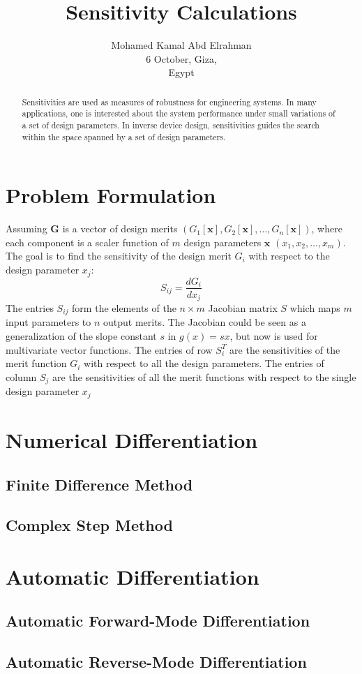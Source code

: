\documentclass{tufte-handout}
\title{Sensitivity Calculations}
\author[mohamedkamal]{Mohamed Kamal Abd Elrahman \\
6 October, Giza,\\ Egypt}
\begin{document}
	\maketitle
	\begin{abstract}
		\noindent 
	Sensitivities are used as measures of robustness for engineering systems. In many applications, one is interested about the system performance under small variations of a set of design parameters. In inverse device design, sensitivities guides the search within the space spanned by a set of design parameters.  
	\end{abstract}
\section{Problem Formulation}	
 Assuming $\mathbf{G}$	is a vector of design merits $ (G_1[\mathbf{x}], G_2[\mathbf{x}], \dots,G_n[\mathbf{x}]) $, where each component is a scaler function of $m$ design parameters $\mathbf{x}$	$ (x_1,x_2,\dots, x_m)$. The goal is to find the sensitivity of the design merit $G_i$  with respect to the design parameter $x_j$:
	 \begin{equation}
	 S_{ij} = \frac{d G_i}{dx_j}
	 \end{equation}
The entries $S_{ij}$ form the elements of the  $n \times m$  Jacobian matrix $S$ which maps $m$ input parameters to $n$ output merits.   The Jacobian could be seen as a generalization of the slope constant $s$ in $g(x) = s x$, but now is used for multivariate vector functions. The entries of row $S_i^T$ are the sensitivities of the merit function $G_i$ with respect to all the design parameters. The entries of column $S_j$ are the sensitivities of all the merit functions with respect to the single design parameter $x_j$  
\section{Numerical Differentiation}

\subsection{Finite Difference Method}
\subsection{Complex Step Method}
\section{Automatic Differentiation}

\subsection{Automatic Forward-Mode Differentiation}
\subsection{Automatic Reverse-Mode Differentiation}
\end{document}
